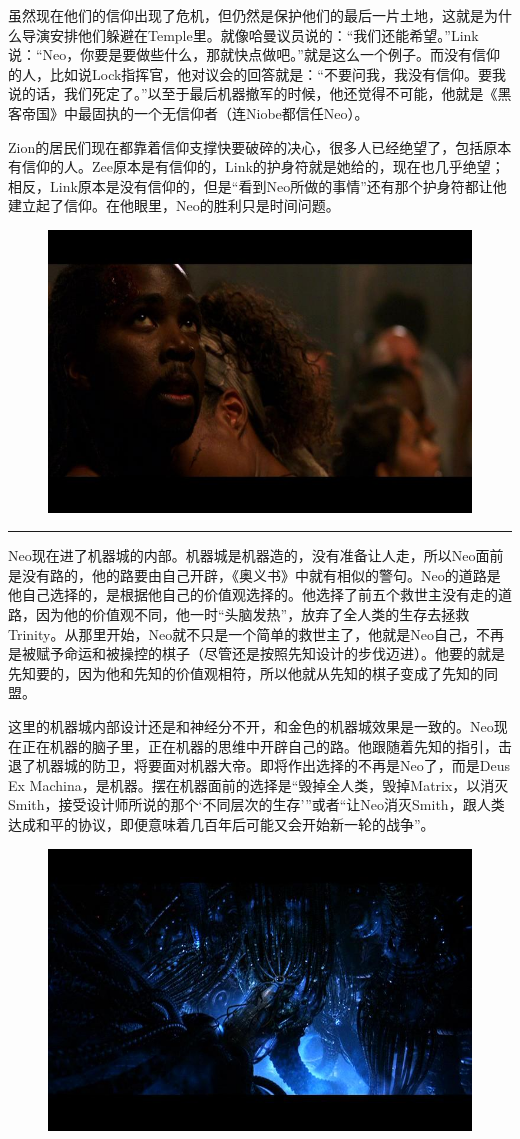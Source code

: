 \documentclass[UTF8]{ctexart}
\newcommand{\myparsep}{\noindent \rule[0.5ex]{\linewidth}{1pt}}
\begin{document}
虽然现在他们的信仰出现了危机，但仍然是保护他们的最后一片土地，这就是为什么导演安排他们躲避在Temple里。就像哈曼议员说的：“我们还能希望。”Link说：“Neo，你要是要做些什么，那就快点做吧。”就是这么一个例子。而没有信仰的人，比如说Lock指挥官，他对议会的回答就是：“不要问我，我没有信仰。要我说的话，我们死定了。”以至于最后机器撤军的时候，他还觉得不可能，他就是《黑客帝国》中最固执的一个无信仰者（连Niobe都信任Neo）。

Zion的居民们现在都靠着信仰支撑快要破碎的决心，很多人已经绝望了，包括原本有信仰的人。Zee原本是有信仰的，Link的护身符就是她给的，现在也几乎绝望；相反，Link原本是没有信仰的，但是“看到Neo所做的事情”还有那个护身符都让他建立起了信仰。在他眼里，Neo的胜利只是时间问题。

\begin{figure}[htb]
\centering
\includegraphics[width=0.5\linewidth]{fig/b897e1fe6155a9305c6008b0.jpg}
\end{figure}

\myparsep

Neo现在进了机器城的内部。机器城是机器造的，没有准备让人走，所以Neo面前是没有路的，他的路要由自己开辟，《奥义书》中就有相似的警句。Neo的道路是他自己选择的，是根据他自己的价值观选择的。他选择了前五个救世主没有走的道路，因为他的价值观不同，他一时“头脑发热”，放弃了全人类的生存去拯救Trinity。从那里开始，Neo就不只是一个简单的救世主了，他就是Neo自己，不再是被赋予命运和被操控的棋子（尽管还是按照先知设计的步伐迈进）。他要的就是先知要的，因为他和先知的价值观相符，所以他就从先知的棋子变成了先知的同盟。

这里的机器城内部设计还是和神经分不开，和金色的机器城效果是一致的。Neo现在正在机器的脑子里，正在机器的思维中开辟自己的路。他跟随着先知的指引，击退了机器城的防卫，将要面对机器大帝。即将作出选择的不再是Neo了，而是Deus Ex Machina，是机器。摆在机器面前的选择是“毁掉全人类，毁掉Matrix，以消灭Smith，接受设计师所说的那个‘不同层次的生存’”或者“让Neo消灭Smith，跟人类达成和平的协议，即便意味着几百年后可能又会开始新一轮的战争”。

\begin{figure}[htb]
\centering
\includegraphics[width=0.5\linewidth]{fig/759c98254541496134a80fb0.jpg}
\end{figure}
\end{document}
